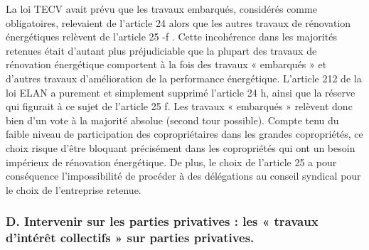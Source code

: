 		La loi TECV avait prévu que les travaux embarqués, considérés comme obligatoires, relevaient de l’article 24 alors que les autres travaux de rénovation énergétiques relèvent de l’article 25 -f . Cette incohérence dans les majorités retenues était d’autant plus préjudiciable que la plupart des travaux de rénovation énergétique comportent à la fois des travaux « embarqués » et d’autres travaux d’amélioration de la performance énergétique.
		L’article 212 de la loi ELAN a purement et simplement supprimé l’article 24 h, ainsi que la réserve qui figurait à ce sujet de l’article 25 f. Les travaux « embarqués » relèvent donc bien d’un vote à la majorité absolue (second tour possible).
		Compte tenu du faible niveau de participation des copropriétaires dans les grandes copropriétés, ce choix risque d’être bloquant précisément dans les copropriétés qui ont un besoin impérieux de rénovation énergétique. De plus, le choix de l’article 25 a pour conséquence l’impossibilité de procéder à des délégations au conseil syndical pour le choix de l’entreprise retenue.
		
		\subsubsection{D. Intervenir sur les parties privatives : les « travaux d’intérêt collectifs » sur parties privatives.}
		
